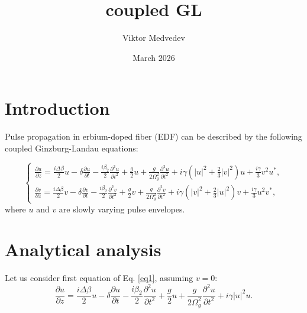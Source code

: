 \documentclass{article}
\title{coupled GL}
\author{Viktor Medvedev}
\date{March 2026}
\begin{document}
    \section{Introduction}
        Pulse propagation in erbium-doped fiber (EDF) can be described by the following coupled Ginzburg-Landau equations:

        \begin{equation} \label{eq1}
            \begin{cases}
                \displaystyle
                \frac{\partial{u}}{\partial{z}} = \frac{i \Delta \beta}{2}u - \delta \frac{\partial{u}}{\partial{t}} - \frac{i\beta_{2}}{2} \frac{\partial^2 u}{\partial t^2} + \frac{g}{2}u + \frac{g}{2\Omega^2_{g}}\frac{\partial^2 u}{\partial t^2} + i\gamma\left(\left|u\right|^2 + \frac{2}{3} \left|v\right|^2\right)u + \frac{i\gamma}{3}v^2 u^*, \\
                \displaystyle
                \frac{\partial{v}}{\partial{z}} = \frac{i \Delta \beta}{2}v - \delta \frac{\partial{v}}{\partial{t}} - \frac{i\beta_{2}}{2} \frac{\partial^2 v}{\partial t^2} + \frac{g}{2}v + \frac{g}{2\Omega^2_{g}}\frac{\partial^2 v}{\partial t^2} + i\gamma\left(\left|v\right|^2 + \frac{2}{3} \left|u\right|^2\right)v + \frac{i\gamma}{3}u^2 v^*,
            \end{cases}
        \end{equation}
        where \(u\) and \(v\) are slowly varying pulse envelopes.
    \section{Analytical analysis} \label{sec:analytical}

        Let us consider first equation of Eq. \ref{eq1}, assuming \(v=0\):
        \begin{equation} \label{eq2}
            \frac{\partial{u}}{\partial{z}} = \frac{i \Delta \beta}{2}u - \delta \frac{\partial{u}}{\partial{t}} - \frac{i\beta_{2}}{2} \frac{\partial^2 u}{\partial t^2} + \frac{g}{2}u + \frac{g}{2\Omega^2_{g}}\frac{\partial^2 u}{\partial t^2} + i\gamma\left|u\right|^2 u.
        \end{equation}
\end{document}
